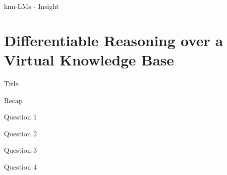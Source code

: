 \documentclass[10pt]{beamer}
\begin{document}
\begin{frame}{knn-LMs - Insight}

\end{frame}

\section{Differentiable Reasoning over a Virtual Knowledge Base}

\begin{frame}{Title}
    
\end{frame}

\begin{frame}{Recap}
    
\end{frame}

\begin{frame}{Question 1}

\end{frame}

\begin{frame}{Question 2}

\end{frame}

\begin{frame}{Question 3}

\end{frame}

\begin{frame}{Question 4}

\end{frame}
\end{document}
